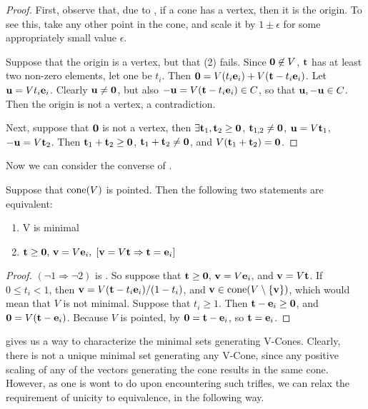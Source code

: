 \begin{proof}
	First, observe that, due to , if a cone has a vertex, then it is the origin.  To see this, take any other point in the cone, and scale it by $1 \pm \epsilon$ for some appropriately small value $\epsilon$.
  
  Suppose that the origin is a vertex, but that (2) fails.  Since $\mathbf{0}\not\in V$, $\mathbf{t}$ has at least two non-zero elements, let one be $t_i$.  Then $\mathbf{0} = V(t_i\mathbf{e}_i) + V(\mathbf{t}-t_i\mathbf{e}_i)$.  Let $\mathbf{u}=V t_i\mathbf{e}_i$.  Clearly $\mathbf{u}\neq\mathbf{0}$, but also $-\mathbf{u} = V(\mathbf{t}-t_i\mathbf{e}_i) \in C$, so that $\mathbf{u},-\mathbf{u}\in C$.  Then the origin is not a vertex, a contradiction.

	Next, suppose that $\mathbf{0}$ is not a vertex, then $\exists\mathbf{t}_1,\mathbf{t}_2\geq\mathbf{0}$, $\mathbf{t}_{1,2}\neq\mathbf{0}$, $\mathbf{u}=V\mathbf{t}_1$, $-\mathbf{u}=V\mathbf{t}_2$.  Then $\mathbf{t}_1+\mathbf{t}_2\geq\mathbf{0}$, $\mathbf{t}_1+\mathbf{t}_2\neq\mathbf{0}$, and $V(\mathbf{t}_1+\mathbf{t}_2)=\mathbf{0}$.
\end{proof}

Now we can consider the converse of .

\begin{Prop}\label{min_vcone_generators}
	Suppose that $\operatorname{cone}(V)$ is pointed.  Then the following two statements are equivalent:
	\begin{enumerate}
		\item V is minimal
		\item $\mathbf{t}\geq\mathbf{0},\,\mathbf{v}=V\mathbf{e}_i,\; [\mathbf{v}=V\mathbf{t} \Rightarrow \mathbf{t}=\mathbf{e}_i]$
	\end{enumerate}
\end{Prop}

\begin{proof}
	$(\neg 1 \Rightarrow \neg 2)$ is .  So suppose that $\mathbf{t}\geq\mathbf{0},\,\mathbf{v}=V\mathbf{e}_i$, and $\mathbf{v}=V\mathbf{t}$.  If $0\leq t_i < 1$, then $\mathbf{v} = V(\mathbf{t}-t_i\mathbf{e}_i)/(1-t_i)$, and $\mathbf{v}\in \operatorname{cone}(V\setminus\{\mathbf{v}\})$, which would mean that $V$ is not minimal.  Suppose that $t_i\geq 1$.  Then $\mathbf{t}-\mathbf{e}_i\geq\mathbf{0}$, and $\mathbf{0}=V(\mathbf{t}-\mathbf{e}_i)$.  Because $V$ is pointed, by  $\mathbf{0}=\mathbf{t}-\mathbf{e}_i$, so $\mathbf{t}=\mathbf{e}_i$.
\end{proof}

 gives us a way to characterize the minimal sets generating V-Cones.  Clearly, there is not a unique minimal set generating any V-Cone, since any positive scaling of any of the vectors generating the cone results in the same cone.  However, as one is wont to do upon encountering such trifles, we can relax the requirement of unicity to equivalence, in the following way.

